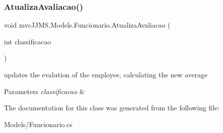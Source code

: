 \subsubsection{\texorpdfstring{Atualiza\+Avaliacao()}{AtualizaAvaliacao()}}
{\footnotesize\ttfamily void mvc\+J\+J\+M\+S.\+Models.\+Funcionario.\+Atualiza\+Avaliacao (\begin{DoxyParamCaption}\item[{int}]{classificacao }\end{DoxyParamCaption})\hspace{0.3cm}{\ttfamily [inline]}}



updates the evalution of the employee, calculating the new average 


\begin{DoxyParams}{Parameters}
{\em classificacao} & \\
\hline
\end{DoxyParams}


The documentation for this class was generated from the following file\+:\begin{DoxyCompactItemize}
\item 
Models/Funcionario.\+cs\end{DoxyCompactItemize}
